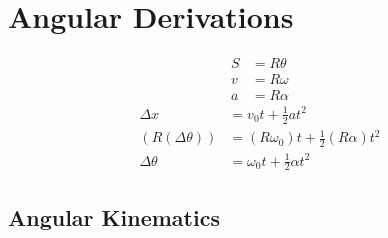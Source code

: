 \documentclass{article}
\begin{document}
\section{Angular Derivations}

\begin{align*}
	S & = R\theta \\
	v & = R\omega \\
	a & = R\alpha
\end{align*}
\begin{align*}
	\Delta x & = v_0t + \frac{1}{2}at^2 \\
	(R(\Delta \theta)) & = (R\omega_0)t + \frac{1}{2}(R\alpha)t^2 \\
	\Delta \theta & = \omega_0 t + \frac{1}{2}\alpha t^2
\end{align*}

\subsection{Angular Kinematics}
\end{document}
